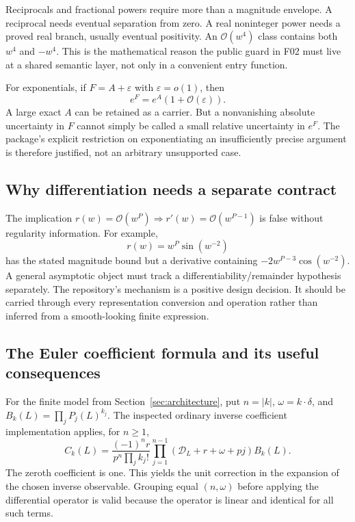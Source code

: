 \documentclass[11pt,a4paper]{article}
\newcommand{\code}[1]{\texttt{\detokenize{#1}}}
\newcommand{\OO}{\mathcal O}
\newcommand{\D}{\mathcal D}
\begin{document}
Reciprocals and fractional powers require more than a magnitude envelope. A reciprocal needs eventual separation from zero. A real noninteger power needs a proved real branch, usually eventual positivity. An \(\OO(w^4)\) class contains both \(w^4\) and \(-w^4\). This is the mathematical reason the public guard in F02 must live at a shared semantic layer, not only in a convenient entry function.

For exponentials, if \(F=A+\varepsilon\) with \(\varepsilon=o(1)\), then
\[
 e^F=e^A(1+\OO(\varepsilon)).
\]
A large exact \(A\) can be retained as a carrier. But a nonvanishing absolute uncertainty in \(F\) cannot simply be called a small relative uncertainty in \(e^F\). The package's explicit restriction on exponentiating an insufficiently precise argument is therefore justified, not an arbitrary unsupported case.\cite{repo-operations}

\subsection{Why differentiation needs a separate contract}
The implication \(r(w)=\OO(w^P)\Rightarrow r'(w)=\OO(w^{P-1})\) is false without regularity information. For example,
\[
 r(w)=w^P\sin(w^{-2})
\]
has the stated magnitude bound but a derivative containing \(-2w^{P-3}\cos(w^{-2})\). A general asymptotic object must track a differentiability/remainder hypothesis separately. The repository's \code{RemainderDerivativeOrder} mechanism is a positive design decision. It should be carried through every representation conversion and operation rather than inferred from a smooth-looking finite expression.\cite{repo-operations,repo-guide,dlmf-asymptotics}

\subsection{The Euler coefficient formula and its useful consequences}
For the finite model from Section~\ref{sec:architecture}, put \(n=|k|\), \(\omega=k\cdot\delta\), and \(B_k(L)=\prod_jP_j(L)^{k_j}\). The inspected ordinary inverse coefficient implementation applies, for \(n\ge1\),
\begin{equation}\label{eq:euler}
 C_k(L)=\frac{(-1)^n r}{p^n\prod_j k_j!}
 \prod_{j=1}^{n-1}\left(\D_L+r+\omega+pj\right)B_k(L).
\end{equation}
The zeroth coefficient is one. This yields the unit correction in the expansion of the chosen inverse observable. Grouping equal \((n,\omega)\) before applying the differential operator is valid because the operator is linear and identical for all such terms.\cite{repo-incremental,repo-article}
\end{document}
